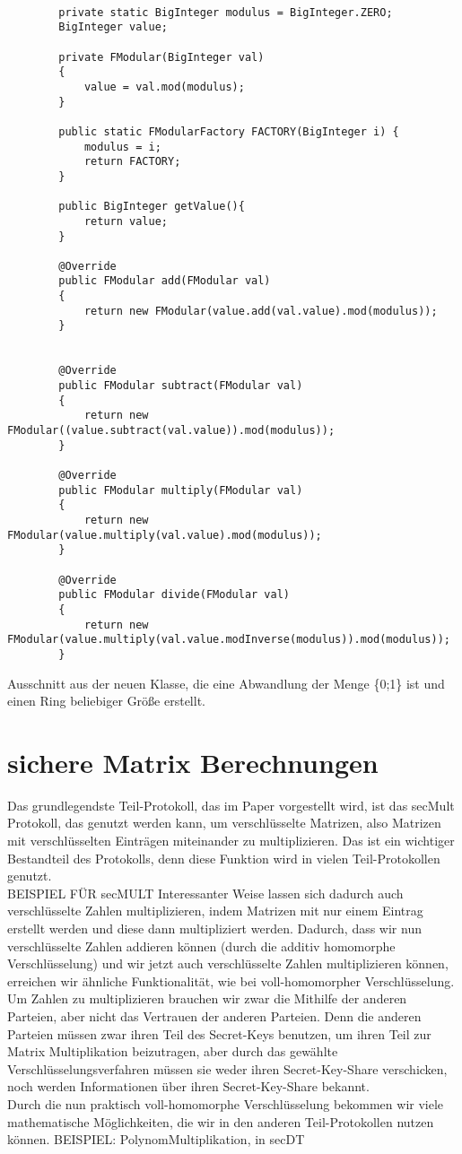 \begin{lstlisting}

        private static BigInteger modulus = BigInteger.ZERO;
        BigInteger value;

        private FModular(BigInteger val)
        {
            value = val.mod(modulus);
        }

        public static FModularFactory FACTORY(BigInteger i) {
            modulus = i;
            return FACTORY;
        }

        public BigInteger getValue(){
            return value;
        }
        
        @Override
        public FModular add(FModular val)
        {
            return new FModular(value.add(val.value).mod(modulus));
        }
        
        
        @Override
        public FModular subtract(FModular val)
        {
            return new FModular((value.subtract(val.value)).mod(modulus));
        }

        @Override
        public FModular multiply(FModular val)
        {
            return new FModular(value.multiply(val.value).mod(modulus));
        }
        
        @Override
        public FModular divide(FModular val)
        {
            return new FModular(value.multiply(val.value.modInverse(modulus)).mod(modulus));
        }
\end{lstlisting}
Ausschnitt aus der neuen Klasse, die eine Abwandlung der Menge \{0;1\} ist und einen Ring beliebiger Größe erstellt.


\section{sichere Matrix Berechnungen}
Das grundlegendste Teil-Protokoll, das im Paper \cite{Doettling2021} vorgestellt wird, ist das secMult Protokoll, das genutzt werden kann, um verschlüsselte Matrizen, also Matrizen mit verschlüsselten Einträgen miteinander zu multiplizieren. Das ist ein wichtiger Bestandteil des Protokolls, denn diese Funktion wird in vielen Teil-Protokollen genutzt.\\
BEISPIEL FÜR secMULT
Interessanter Weise lassen sich dadurch auch verschlüsselte Zahlen multiplizieren, indem Matrizen mit nur einem Eintrag erstellt werden und diese dann multipliziert werden. Dadurch, dass wir nun verschlüsselte Zahlen addieren können (durch die additiv homomorphe Verschlüsselung) und wir jetzt auch verschlüsselte Zahlen multiplizieren können, erreichen wir ähnliche Funktionalität, wie bei voll-homomorpher Verschlüsselung. Um Zahlen zu multiplizieren brauchen wir zwar die Mithilfe der anderen Parteien, aber nicht das Vertrauen der anderen Parteien. Denn die anderen Parteien müssen zwar ihren Teil des Secret-Keys benutzen, um ihren Teil zur Matrix Multiplikation beizutragen, aber durch das gewählte Verschlüsselungsverfahren müssen sie weder ihren Secret-Key-Share verschicken, noch werden Informationen über ihren Secret-Key-Share bekannt.\\
Durch die nun praktisch voll-homomorphe Verschlüsselung bekommen wir viele mathematische Möglichkeiten, die wir in den anderen Teil-Protokollen nutzen können.
BEISPIEL: PolynomMultiplikation, in secDT
